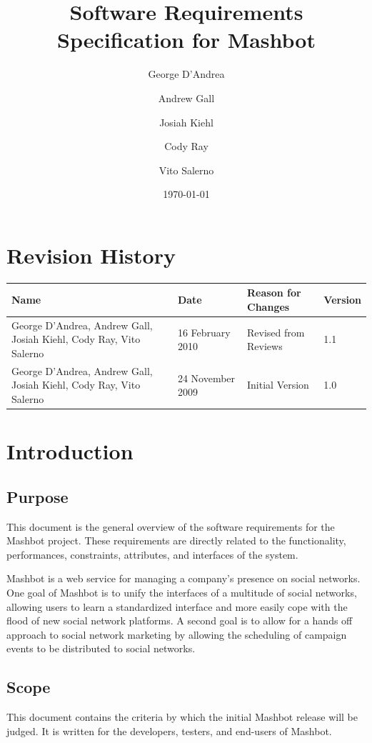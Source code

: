 \documentclass{article}
\begin{document}
\title{Software Requirements Specification for Mashbot} 
\author{George D'Andrea \and Andrew Gall \and Josiah Kiehl \and
  Cody Ray \and Vito Salerno}
\date{\today}
\begin{titlepage}
\maketitle
\end{titlepage}

\section*{Revision History}
\begin{tabular}{|p{2in}|l|l|l|}
  \hline
  \textbf{Name} & \textbf{Date} & \textbf{Reason for Changes} & \textbf{Version} \\
  \hline \hline
  George D'Andrea, Andrew Gall, Josiah Kiehl, Cody Ray, Vito
  Salerno & 16 February 2010 & Revised from Reviews & 1.1 \\
  \hline
  George D'Andrea, Andrew Gall, Josiah Kiehl, Cody Ray, Vito
  Salerno & 24 November 2009 & Initial Version & 1.0 \\
  \hline
\end{tabular}

\clearpage
\tableofcontents
\clearpage

\section{Introduction}

\subsection{Purpose} %
This document is the general overview of the software requirements for
the Mashbot project. These requirements are directly related to the
functionality, performances, constraints, attributes, and interfaces
of the system.

Mashbot is a web service for managing a company's presence on social
networks. One goal of Mashbot is to unify the interfaces of a
multitude of social networks, allowing users to learn a standardized
interface and more easily cope with the flood of new social network
platforms. A second goal is to allow for a hands off approach to
social network marketing by allowing the scheduling of campaign events
to be distributed to social networks.
 
\subsection{Scope} %
This document contains the criteria by which the initial Mashbot
release will be judged. It is written for the developers, testers, and
end-users of Mashbot.
\end{document}
